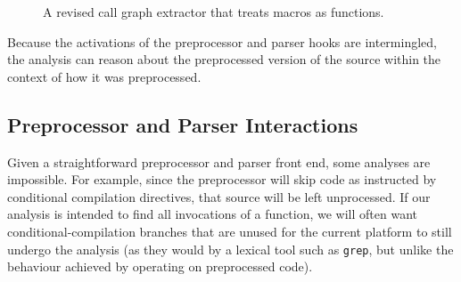 \documentclass{article}
\begin{document}
\begin{figure}[hbt]
\begin{center}
\begin{small}
\end{small}
\caption{A revised call graph extractor that treats macros as functions.}
\label{fig:rev_call_graph_extractor}
\end{center}
\end{figure}

Because the activations of the preprocessor and parser hooks
are intermingled, the analysis can reason about the preprocessed version 
of the source within the context of how it was preprocessed.  

\subsection{Preprocessor and Parser Interactions}
\label{sec:interactions}

Given a straightforward preprocessor and parser front end, some analyses
are impossible.  For example, since the preprocessor will skip code as
instructed by conditional compilation directives, that source will be
left unprocessed. If our analysis is intended to find all invocations
of a function, we will often want conditional-compilation branches that
are unused for the current platform to still undergo the analysis (as
they would by a lexical tool such as \texttt{grep}, but unlike the
behaviour achieved by operating on preprocessed code).
\end{document}
